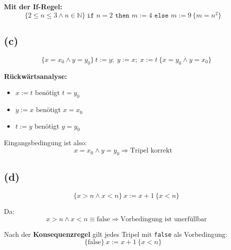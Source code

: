 \documentclass[a4paper,12pt]{article}
\begin{document}
\textbf{Mit der If-Regel:}
\[
\{2 \leq n \leq 3 \land n \in \mathbb{N}\}~
\texttt{if } n = 2 \texttt{ then } m := 4 \texttt{ else } m := 9~
\{m = n^2\}
\quad 
\]

\subsection*{(c)}

\[
\{x = x_0 \land y = y_0\}~
t := y;\; y := x;\; x := t~
\{x = y_0 \land y = x_0\}
\]

\textbf{Rückwärtsanalyse:}

\begin{itemize}
  \item $x := t$ benötigt $t = y_0$
  \item $y := x$ benötigt $x = x_0$
  \item $t := y$ benötigt $y = y_0$
\end{itemize}

Eingangsbedingung ist also:
\[
x = x_0 \land y = y_0
\Rightarrow \text{Tripel korrekt} \quad
\]

\subsection*{(d)}

\[
\{x > n \land x < n\}~x := x + 1~\{x < n\}
\]

Da:
\[
x > n \land x < n \equiv \text{false}
\Rightarrow \text{Vorbedingung ist unerfüllbar}
\]

Nach der \textbf{Konsequenzregel} gilt jedes Tripel mit \texttt{false} als Vorbedingung:
\[
\{\text{false}\}~x := x + 1~\{x < n\}
\quad 
\]
\end{document}
